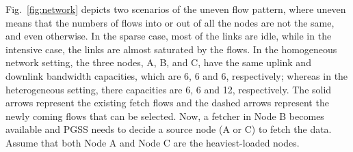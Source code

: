 \documentclass[10pt,journal,compsoc]{IEEEtran}
\begin{document}

Fig.~\ref{fig:network} depicts 
two scenarios of the uneven flow pattern, where uneven means
that the numbers of flows into or out of all the nodes are not the same, and even otherwise. 
In the sparse case, most of the links are idle, while in the intensive case, the
links are almost saturated by the flows.
In the homogeneous network setting,
the three nodes, A, B, and C, have the same uplink and downlink bandwidth
capacities, %
which are 6, 6 and 6, respectively; whereas in the heterogeneous setting,
there capacities are 6, 6 and 12, respectively.
The solid arrows represent the existing fetch flows and the dashed arrows represent the newly coming flows that can be selected. 
Now, a fetcher in Node B becomes available and PGSS needs to decide a source
node (A or C) to fetch the data. 
Assume that both Node A and Node C are the heaviest-loaded nodes.
\end{document}
